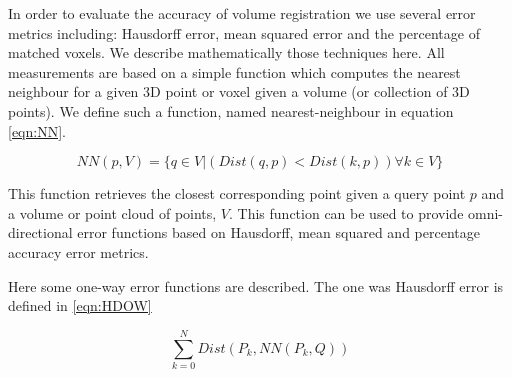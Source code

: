 In order to evaluate the accuracy of volume registration we use several error metrics including: Hausdorff error, mean squared error and the percentage of matched voxels. We describe mathematically those techniques here. All measurements are based on a simple function which computes the nearest neighbour for a given 3D point or voxel given a volume (or collection of 3D points). We define such a function, named nearest-neighbour in equation \ref{eqn:NN}.

\begin{equation} \label{eqn:NN}
NN(p, V) =  \{ q \in V | (Dist(q, p) < Dist(k, p))  \forall k \in V \}
\end{equation}

This function retrieves the closest corresponding point given a query point $p$ and a volume or point cloud of points, $V$. This function can be used to provide omni-directional error functions based on Hausdorff, mean squared and percentage accuracy error metrics.

Here some one-way error functions are described. The one was Hausdorff error is defined in \ref{eqn:HDOW} 

\begin{equation} \label{eqn:HDOW}
\sum_{k=0}^{N} Dist(P_k, NN(P_k, Q))
\end{equation}
